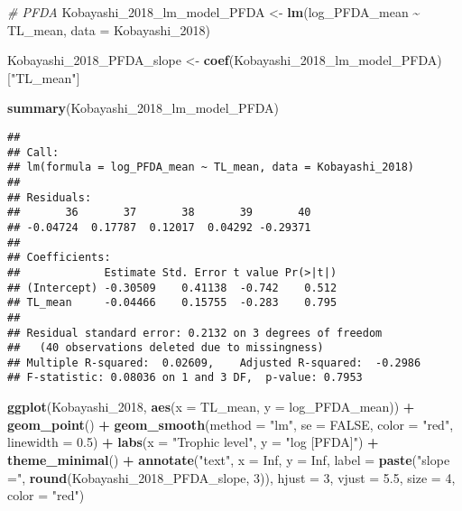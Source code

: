 \documentclass[
]{article}
\newenvironment{Shaded}{\begin{snugshade}}{\end{snugshade}}
\newcommand{\AttributeTok}[1]{\textcolor[rgb]{0.13,0.29,0.53}{#1}}
\newcommand{\CommentTok}[1]{\textcolor[rgb]{0.56,0.35,0.01}{\textit{#1}}}
\newcommand{\ConstantTok}[1]{\textcolor[rgb]{0.56,0.35,0.01}{#1}}
\newcommand{\DecValTok}[1]{\textcolor[rgb]{0.00,0.00,0.81}{#1}}
\newcommand{\FloatTok}[1]{\textcolor[rgb]{0.00,0.00,0.81}{#1}}
\newcommand{\FunctionTok}[1]{\textcolor[rgb]{0.13,0.29,0.53}{\textbf{#1}}}
\newcommand{\NormalTok}[1]{#1}
\newcommand{\OtherTok}[1]{\textcolor[rgb]{0.56,0.35,0.01}{#1}}
\newcommand{\SpecialCharTok}[1]{\textcolor[rgb]{0.81,0.36,0.00}{\textbf{#1}}}
\newcommand{\StringTok}[1]{\textcolor[rgb]{0.31,0.60,0.02}{#1}}
\begin{document}
\begin{Shaded}
\begin{Highlighting}[]
\CommentTok{\# PFDA}
\NormalTok{Kobayashi\_2018\_lm\_model\_PFDA }\OtherTok{\textless{}{-}} \FunctionTok{lm}\NormalTok{(log\_PFDA\_mean }\SpecialCharTok{\textasciitilde{}}\NormalTok{ TL\_mean,}
                                    \AttributeTok{data =}\NormalTok{ Kobayashi\_2018)}

\NormalTok{Kobayashi\_2018\_PFDA\_slope }\OtherTok{\textless{}{-}} \FunctionTok{coef}\NormalTok{(Kobayashi\_2018\_lm\_model\_PFDA)[}\StringTok{"TL\_mean"}\NormalTok{]}

\FunctionTok{summary}\NormalTok{(Kobayashi\_2018\_lm\_model\_PFDA)}
\end{Highlighting}
\end{Shaded}

\begin{verbatim}
## 
## Call:
## lm(formula = log_PFDA_mean ~ TL_mean, data = Kobayashi_2018)
## 
## Residuals:
##       36       37       38       39       40 
## -0.04724  0.17787  0.12017  0.04292 -0.29371 
## 
## Coefficients:
##             Estimate Std. Error t value Pr(>|t|)
## (Intercept) -0.30509    0.41138  -0.742    0.512
## TL_mean     -0.04466    0.15755  -0.283    0.795
## 
## Residual standard error: 0.2132 on 3 degrees of freedom
##   (40 observations deleted due to missingness)
## Multiple R-squared:  0.02609,    Adjusted R-squared:  -0.2986 
## F-statistic: 0.08036 on 1 and 3 DF,  p-value: 0.7953
\end{verbatim}

\begin{Shaded}
\begin{Highlighting}[]
\FunctionTok{ggplot}\NormalTok{(Kobayashi\_2018, }\FunctionTok{aes}\NormalTok{(}\AttributeTok{x =}\NormalTok{ TL\_mean, }\AttributeTok{y =}\NormalTok{ log\_PFDA\_mean)) }\SpecialCharTok{+}
  \FunctionTok{geom\_point}\NormalTok{() }\SpecialCharTok{+}
  \FunctionTok{geom\_smooth}\NormalTok{(}\AttributeTok{method =} \StringTok{"lm"}\NormalTok{, }\AttributeTok{se =} \ConstantTok{FALSE}\NormalTok{, }\AttributeTok{color =} \StringTok{"red"}\NormalTok{, }\AttributeTok{linewidth =} \FloatTok{0.5}\NormalTok{) }\SpecialCharTok{+}
  \FunctionTok{labs}\NormalTok{(}\AttributeTok{x =} \StringTok{"Trophic level"}\NormalTok{,}
       \AttributeTok{y =} \StringTok{"log [PFDA]"}\NormalTok{) }\SpecialCharTok{+}
  \FunctionTok{theme\_minimal}\NormalTok{() }\SpecialCharTok{+}
  \FunctionTok{annotate}\NormalTok{(}\StringTok{"text"}\NormalTok{, }\AttributeTok{x =} \ConstantTok{Inf}\NormalTok{, }\AttributeTok{y =} \ConstantTok{Inf}\NormalTok{, }\AttributeTok{label =} \FunctionTok{paste}\NormalTok{(}\StringTok{"slope ="}\NormalTok{, }\FunctionTok{round}\NormalTok{(Kobayashi\_2018\_PFDA\_slope, }\DecValTok{3}\NormalTok{)), }
           \AttributeTok{hjust =} \DecValTok{3}\NormalTok{, }\AttributeTok{vjust =} \FloatTok{5.5}\NormalTok{, }\AttributeTok{size =} \DecValTok{4}\NormalTok{, }\AttributeTok{color =} \StringTok{"red"}\NormalTok{)}
\end{Highlighting}
\end{Shaded}
\end{document}
